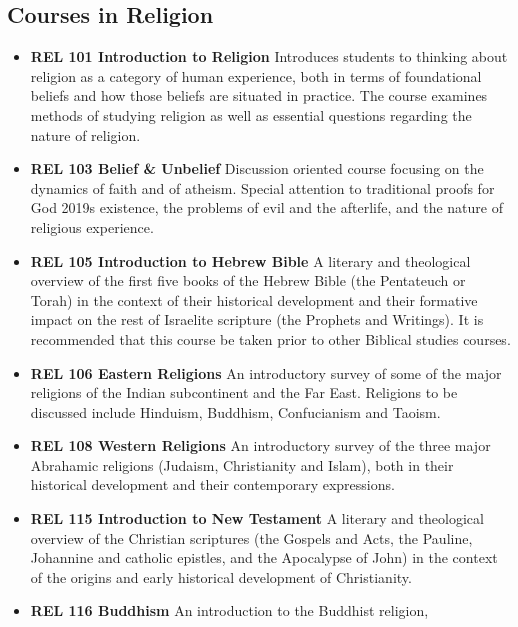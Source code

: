 \documentclass[
  letterpaper,
]{scrbook}
\providecommand{\tightlist}{%
  \setlength{\itemsep}{0pt}\setlength{\parskip}{0pt}}
\begin{document}
\hypertarget{courses-in-religion}{%
\subsection{Courses in Religion}\label{courses-in-religion}}

\begin{itemize}
\tightlist
\item
  \textbf{REL 101 Introduction to Religion} Introduces students to
  thinking about religion as a category of human experience, both in
  terms of foundational beliefs and how those beliefs are situated in
  practice. The course examines methods of studying religion as well as
  essential questions regarding the nature of religion.\\
\item
  \textbf{REL 103 Belief \& Unbelief} Discussion oriented course
  focusing on the dynamics of faith and of atheism. Special attention to
  traditional proofs for God 2019s existence, the problems of evil and
  the afterlife, and the nature of religious experience.
\item
  \textbf{REL 105 Introduction to Hebrew Bible} A literary and
  theological overview of the first five books of the Hebrew Bible (the
  Pentateuch or Torah) in the context of their historical development
  and their formative impact on the rest of Israelite scripture (the
  Prophets and Writings). It is recommended that this course be taken
  prior to other Biblical studies courses.\\
\item
  \textbf{REL 106 Eastern Religions} An introductory survey of some of
  the major religions of the Indian subcontinent and the Far East.
  Religions to be discussed include Hinduism, Buddhism, Confucianism and
  Taoism.
\item
  \textbf{REL 108 Western Religions} An introductory survey of the three
  major Abrahamic religions (Judaism, Christianity and Islam), both in
  their historical development and their contemporary expressions.\\
\item
  \textbf{REL 115 Introduction to New Testament} A literary and
  theological overview of the Christian scriptures (the Gospels and
  Acts, the Pauline, Johannine and catholic epistles, and the Apocalypse
  of John) in the context of the origins and early historical
  development of Christianity.
\item
  \textbf{REL 116 Buddhism} An introduction to the Buddhist religion,

\end{itemize}
\end{document}
